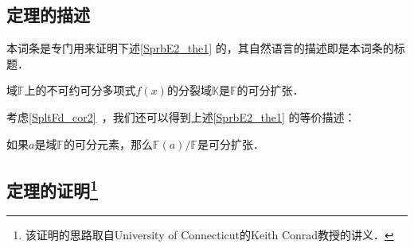 

\subsection{定理的描述}

本词条是专门用来证明下述\autoref{SprbE2_the1} 的，其自然语言的描述即是本词条的标题．

\begin{theorem}{}\label{SprbE2_the1}
域$\mathbb{F}$上的不可约可分多项式$f(x)$的分裂域$\mathbb{K}$是$\mathbb{F}$的可分扩张．
\end{theorem}

考虑\autoref{SpltFd_cor2}~，我们还可以得到上述\autoref{SprbE2_the1} 的等价描述：

\begin{theorem}{}
如果$a$是域$\mathbb{F}$的可分元素，那么$\mathbb{F}(a)/\mathbb{F}$是可分扩张．
\end{theorem}



\subsection{定理的证明\footnote{该证明的思路取自University of Connecticut的Keith Conrad教授的讲义．}}





















